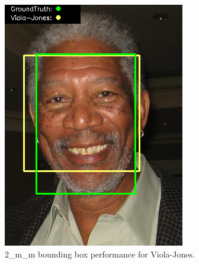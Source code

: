 \documentclass{l4proj}
\begin{document}
\begin{appendices}
\begin{figure}[h!]
  \centering
  \begin{minipage}{0.49\textwidth}
    \centering
     \includegraphics[width=\textwidth]{images/appendix/viola/2.png}
    \caption{2\_m\_m bounding box performance for Viola-Jones.}
    \label{whoopi_result}
  \end{minipage}
    \hfill
    \begin{minipage}{0.49\textwidth}
    \centering

\end{minipage}
\end{figure}
\end{appendices}
\end{document}
